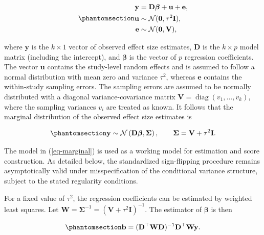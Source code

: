 \documentclass[
  man,
  longtable,
  nolmodern,
  notxfonts,
  notimes,
  colorlinks=true,linkcolor=blue,citecolor=blue,urlcolor=blue]{apa7}
\begin{document}
\begin{equation}\phantomsection\label{eq-meta-reg}{
\begin{aligned}
\mathbf{y} &= \mathbf{D} \boldsymbol{\beta} + \mathbf{u} + \mathbf{e}, \\
\mathbf{u} &\sim \mathcal{N}(\mathbf{0}, \tau^2\mathbf{I}), \\
\mathbf{e} &\sim \mathcal{N}(\mathbf{0}, \mathbf{V}),
\end{aligned}
}\end{equation}

where \(\mathbf{y}\) is the \(k \times 1\) vector of observed effect
size estimates, \(\mathbf{D}\) is the \(k \times p\) model matrix
(including the intercept), and \(\boldsymbol{\beta}\) is the vector of
\(p\) regression coefficients. The vector \(\mathbf{u}\) contains the
study-level random effects and is assumed to follow a normal
distribution with mean zero and variance \(\tau^2\), whereas
\(\mathbf{e}\) contains the within-study sampling errors. The sampling
errors are assumed to be normally distributed with a diagonal
variance-covariance matrix
\(\mathbf{V} = \operatorname{diag}(v_1,\ldots,v_k)\), where the sampling
variances \(v_i\) are treated as known. It follows that the marginal
distribution of the observed effect size estimates is

\begin{equation}\phantomsection\label{eq-marginal}{
\mathbf{y} \sim \mathcal{N}\left(\mathbf{D}\boldsymbol{\beta}, \boldsymbol{\Sigma}\right),
\qquad
\boldsymbol{\Sigma} = \mathbf{V} + \tau^2 \mathbf{I}.
}\end{equation}

The model in (\ref{eq-marginal}) is used as a working model for
estimation and score construction. As detailed below, the standardized
sign-flipping procedure remains asymptotically valid under
misspecification of the conditional variance structure, subject to the
stated regularity conditions.

For a fixed value of \(\tau^2\), the regression coefficients can be
estimated by weighted least squares. Let
\(\mathbf{W} = \boldsymbol{\Sigma}^{-1} = (\mathbf{V} + \tau^2 \mathbf{I})^{-1}\).
The estimator of \(\boldsymbol{\beta}\) is then

\begin{equation}\phantomsection\label{eq-wls}{
\mathbf{b}
=
(\mathbf{D}^{\top}\mathbf{W}\mathbf{D})^{-1}
\mathbf{D}^{\top}\mathbf{W}\mathbf{y}.
}\end{equation}
\end{document}
